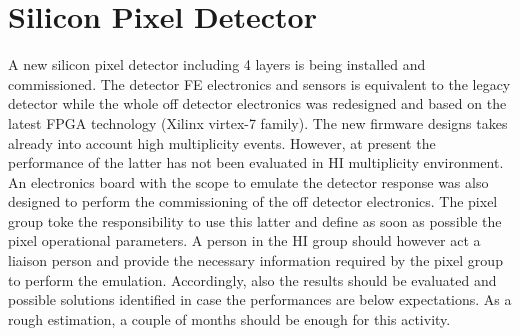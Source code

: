 \newpage

\section{Silicon Pixel Detector\label{sec:SiPixel}}
A new silicon pixel detector including 4 layers is being installed and commissioned. The detector FE electronics and
sensors is equivalent to the legacy detector while the whole off detector electronics was redesigned and based on the
latest FPGA technology (Xilinx virtex-7 family). The new firmware designs takes already into account high multiplicity
events. However, at present the performance of the latter has not been evaluated in HI multiplicity environment. An
electronics board with the scope to emulate the detector response was also designed to perform the commissioning of the
off detector electronics. The pixel group toke the responsibility to use this latter and define as soon as possible the
pixel operational parameters. A person in the HI group should however act a liaison person and provide the necessary
information required by the pixel group to perform the emulation. Accordingly, also the results should be evaluated and
possible solutions identified in case the performances are below expectations. As a rough estimation, a couple of months
should be enough for this activity.


